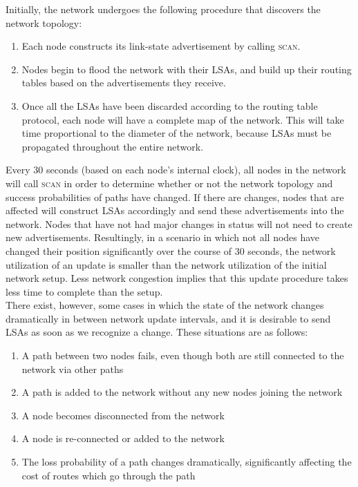 \documentclass[letterpaper]{article}
\begin{document}
\noindent Initially, the network undergoes the following procedure that discovers the network topology:

\begin{enumerate}
  \item Each node constructs its link-state advertisement by calling \textsc{scan}. 
  \item Nodes begin to flood the network with their LSAs, and build up their routing tables based on
  the advertisements they receive.
  \item Once all the LSAs have been discarded according to the routing table protocol, each node will have
  a complete map of the network. This will take time proportional to the diameter of the network, because
  LSAs must be propagated throughout the entire network.
\end{enumerate}

\noindent Every 30 seconds (based on each node's internal clock), all nodes in the network will call 
\textsc{scan} in order to determine whether or not the network topology and success probabilities of
paths have changed. If there are changes, nodes that are affected will construct LSAs accordingly and send
these advertisements into the network. Nodes that have not had major changes in status will not need to
create new advertisements. Resultingly, in a scenario in which not all nodes have changed their position
significantly over the course of 30 seconds, the network utilization of an update is smaller than the
network utilization of the initial network setup. Less network congestion implies that this update
procedure takes less time to complete than the setup.
\\

\noindent There exist, however, some cases in which the state of the network changes dramatically in 
between network update intervals, and it is desirable to send LSAs as soon as we recognize a change.
These situations are as follows:

\begin{enumerate}
  \item A path between two nodes fails, even though both are still connected to the network via other
  paths
  \item A path is added to the network without any new nodes joining the network
  \item A node becomes disconnected from the network
  \item A node is re-connected or added to the network
  \item The loss probability of a path changes dramatically, significantly affecting the cost of
  routes which go through the path
\end{enumerate}
\end{document}
